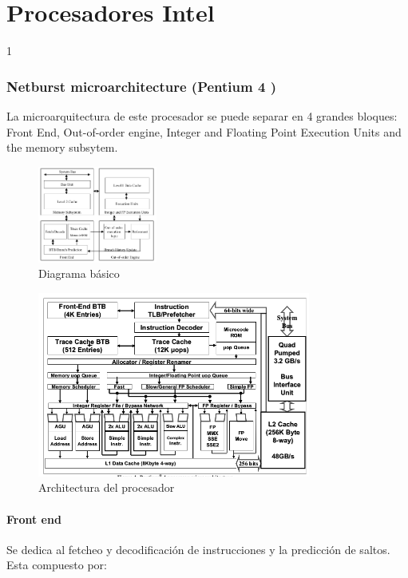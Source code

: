 \part{Procesadores Intel}
1
\section{Netburst microarchitecture (Pentium 4 \cite{Sager01themicroarchitecture})}
La microarquitectura de este procesador se puede separar en 4 grandes bloques: Front End, Out-of-order engine, Integer and Floating Point Execution Units and the memory subsytem.

\begin{figure}[ht]
	\centering
	\includegraphics[width=0.35\textwidth]{imagenes/p4-block-architecture}
	\caption{Diagrama básico}
	\label{fig:p4DiagramaBasico}
\end{figure}
\begin{figure}[ht]
	\centering
	\includegraphics[width=0.8\textwidth]{imagenes/p4-architecture}
	\caption{Architectura del procesador}
	\label{fig:p4DiagramaCompleto}
\end{figure}

\subsection{Front end}
Se dedica al fetcheo y decodificación de instrucciones y la predicción de saltos. Esta compuesto por:
